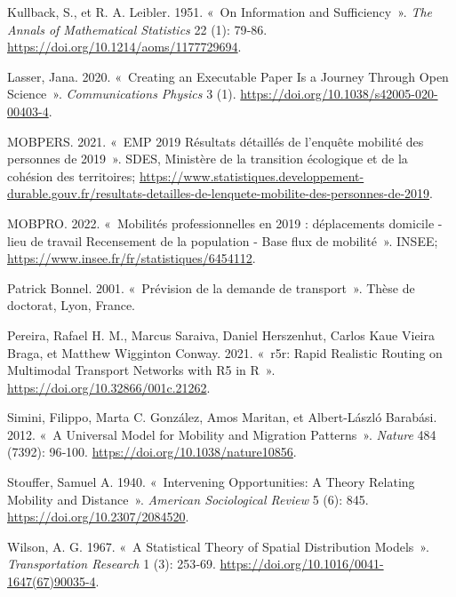 \documentclass[
  10pt,
  a4paper,
  numbers=noendperiod,
  DIV=9]{scrartcl}
\newlength{\cslhangindent}
\newlength{\cslentryspacingunit} %
\newenvironment{CSLReferences}[2] %
 {%
  \setlength{\parindent}{0pt}
  \ifodd #1
  \let\oldpar\par
  \def\par{\hangindent=\cslhangindent\oldpar}
  \fi
  \setlength{\parskip}{#2\cslentryspacingunit}
 }%
 {}
\begin{document}
\begin{CSLReferences}{1}{0}
\leavevmode{}%
Kullback, S., et R. A. Leibler. 1951. {«~On Information and
Sufficiency~»}. \emph{The Annals of Mathematical Statistics} 22 (1):
79‑86. \url{https://doi.org/10.1214/aoms/1177729694}.

\leavevmode{}%
Lasser, Jana. 2020. {«~Creating an Executable Paper Is a Journey Through
Open Science~»}. \emph{Communications Physics} 3 (1).
\url{https://doi.org/10.1038/s42005-020-00403-4}.

\leavevmode{}%
MOBPERS. 2021. {«~EMP 2019 Résultats détaillés de l'enquête mobilité des
personnes de 2019~»}. SDES, Ministère de la transition écologique et de
la cohésion des territoires;
\url{https://www.statistiques.developpement-durable.gouv.fr/resultats-detailles-de-lenquete-mobilite-des-personnes-de-2019}.

\leavevmode{}%
MOBPRO. 2022. {«~Mobilités professionnelles en 2019 : déplacements
domicile - lieu de travail Recensement de la population - Base flux de
mobilité~»}. INSEE; \url{https://www.insee.fr/fr/statistiques/6454112}.

\leavevmode{}%
Patrick Bonnel. 2001. {«~Prévision de la demande de transport~»}. Thèse
de doctorat, Lyon, France.

\leavevmode{}%
Pereira, Rafael H. M., Marcus Saraiva, Daniel Herszenhut, Carlos Kaue
Vieira Braga, et Matthew Wigginton Conway. 2021. {«~r5r: Rapid Realistic
Routing on Multimodal Transport Networks with R5 in R~»}.
\url{https://doi.org/10.32866/001c.21262}.

\leavevmode{}%
Simini, Filippo, Marta C. González, Amos Maritan, et Albert-László
Barabási. 2012. {«~A Universal Model for Mobility and Migration
Patterns~»}. \emph{Nature} 484 (7392): 96‑100.
\url{https://doi.org/10.1038/nature10856}.

\leavevmode{}%
Stouffer, Samuel A. 1940. {«~Intervening Opportunities: A Theory
Relating Mobility and Distance~»}. \emph{American Sociological Review} 5
(6): 845. \url{https://doi.org/10.2307/2084520}.

\leavevmode{}%
Wilson, A. G. 1967. {«~A Statistical Theory of Spatial Distribution
Models~»}. \emph{Transportation Research} 1 (3): 253‑69.
\url{https://doi.org/10.1016/0041-1647(67)90035-4}.

\end{CSLReferences}
\end{document}
